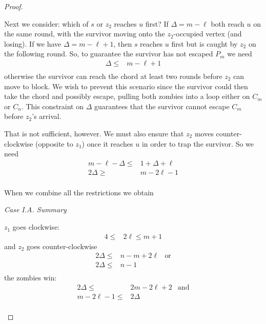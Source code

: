 \begin{proof}
\begin{proofpart}
  Next we consider: which of $s$ or $z_2$ reaches $u$ first?
  If $\Delta = m - \ell$ both reach $u$ on the same round,
  with the survivor moving onto the $z_2$-occupied vertex (and losing).
  If we have $\Delta = m - \ell + 1$, then $s$ reaches $u$ first
  but is caught by $z_2$ on the following round.
  So, to guarantee the survivor has not escaped $P_m$ we need
  \begin{align*}
   \Delta \leq & m- \ell + 1 \\
  \end{align*}
  otherwise the survivor can reach the chord at least two rounds
  before $z_2$ can move to block. We wish to prevent this scenario since
  the survivor could then take the chord and possibly escape, pulling
  both zombies into a loop either on $C_{m}$ or $C_{n}$.
  This constraint on $\Delta$ guarantees that the survivor cannot
  escape $C_m$ before $z_2$'s arrival.

  That is not sufficient, however. We must also ensure that $z_2$ moves
  counter-clockwise (opposite to $z_1$) once it reaches $u$ in order to trap the
  survivor. So we need
  \begin{align*}
   m - \ell - \Delta \leq & 1 + \Delta + \ell \\
   2 \Delta \geq          & m - 2\ell  -1     \\
  \end{align*}

  When we combine all the restrictions we obtain

  \textit{Case I.A. Summary}

  $z_1$ goes clockwise:
  \begin{align*}
   4 \leq & 2 \ell \leq m + 1
  \end{align*}
  and $z_2$ goes counter-clockwise
  \begin{align*}
   2 \Delta \leq & n - m + 2\ell & \text{or} \\
   2 \Delta \leq & n - 1                     \\
  \end{align*}
  the zombies win:
  \begin{align*}
   2 \Delta \leq      & 2 m- 2 \ell + 2 & \text{and} \\
   m - 2\ell  -1 \leq & 2 \Delta                     \\
  \end{align*}


\end{proofpart}
\end{proof}
